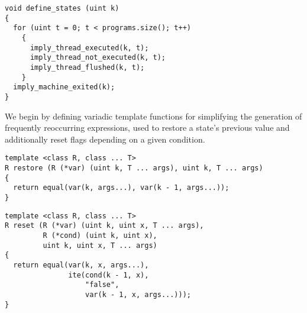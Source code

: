 
\begin{lstlisting}[style=c++]
void define_states (uint k)
{
  for (uint t = 0; t < programs.size(); t++)
    {
      imply_thread_executed(k, t);
      imply_thread_not_executed(k, t);
      imply_thread_flushed(k, t);
    }
  imply_machine_exited(k);
}
\end{lstlisting}

\noindent
We begin by defining variadic template functions for simplifying the generation of frequently reoccurring expressions, used to restore a state's previous value and additionally reset flags depending on a given condition.

\begin{lstlisting}[style=c++]
template <class R, class ... T>
R restore (R (*var) (uint k, T ... args), uint k, T ... args)
{
  return equal(var(k, args...), var(k - 1, args...));
}
\end{lstlisting}

\begin{lstlisting}[style=c++, aboveskip=0pt]
template <class R, class ... T>
R reset (R (*var) (uint k, uint x, T ... args),
         R (*cond) (uint k, uint x),
         uint k, uint x, T ... args)
{
  return equal(var(k, x, args...),
               ite(cond(k - 1, x),
                   "false",
                   var(k - 1, x, args...)));
}
\end{lstlisting}

